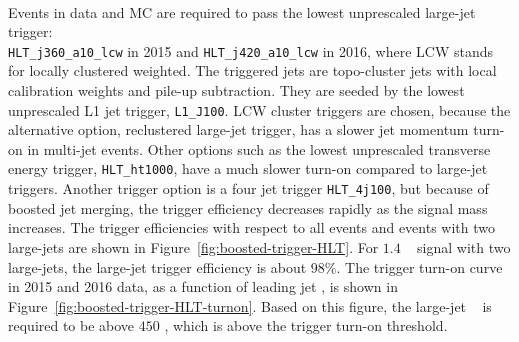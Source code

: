 \paragraph{}
Events in data and MC are required to pass the lowest unprescaled large-\R jet trigger: \\
\verb|HLT_j360_a10_lcw| in 2015 and \verb|HLT_j420_a10_lcw| in 2016, where LCW stands for locally clustered weighted. 
The triggered jets are topo-cluster jets with local calibration weights and pile-up subtraction.
They are seeded by the lowest unprescaled L1 jet trigger, \texttt{L1\_J100}. 
LCW cluster triggers are chosen, because the alternative option, reclustered large-\R jet trigger, has a slower jet momentum turn-on in multi-jet events. 
Other options such as the lowest unprescaled transverse energy trigger, \verb|HLT_ht1000|, have a much slower turn-on compared to large-\R jet triggers.
Another trigger option is a four jet trigger \verb|HLT_4j100|, but because of boosted jet merging, the trigger efficiency decreases rapidly as the signal mass increases. 
The trigger efficiencies with respect to all events and events with two large-\R jets are shown in Figure~\ref{fig:boosted-trigger-HLT}.
For $1.4$ \TeV~ signal with two large-\R jets, the large-\R jet trigger efficiency is about $98\%$.
The trigger turn-on curve in 2015 and 2016 data, as a function of leading jet \pt, is shown in Figure~\ref{fig:boosted-trigger-HLT-turnon}.
Based on this figure, the large-\R jet \pt~ is required to be above $450$ \GeV, which is above the trigger turn-on threshold.

